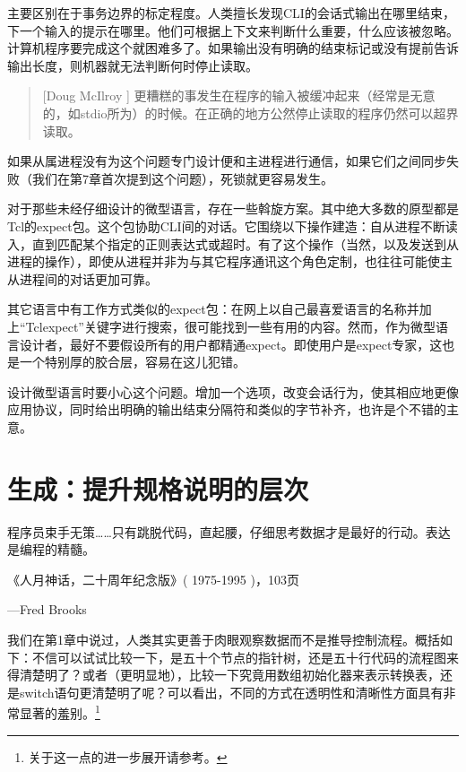 \documentclass[12pt,oneside]{book}
\begin{document}
\begin{common-format}
主要区别在于事务边界的标定程度。人类擅长发现CLI的会话式输出在哪里结束，下一个输入的提示在哪里。他们可根据上下文来判断什么重要，什么应该被忽略。计算机程序要完成这个就困难多了。如果输出没有明确的结束标记或没有提前告诉输出长度，则机器就无法判断何时停止读取。

\begin{quote}[Doug McIlroy 	]
更糟糕的事发生在程序的输入被缓冲起来（经常是无意的，如stdio所为）的时候。在正确的地方公然停止读取的程序仍然可以超界读取。
\end{quote}

如果从属进程没有为这个问题专门设计便和主进程进行通信，如果它们之间同步失败（我们在第7章首次提到这个问题），死锁就更容易发生。

对于那些未经仔细设计的微型语言，存在一些斡旋方案。其中绝大多数的原型都是Tcl的expect包。这个包协助CLI间的对话。它围绕以下操作建造：自从进程不断读入，直到匹配某个指定的正则表达式或超时。有了这个操作（当然，以及发送到从进程的操作），即使从进程并非为与其它程序通讯这个角色定制，也往往可能使主从进程间的对话更加可靠。

其它语言中有工作方式类似的expect包：在网上以自己最喜爱语言的名称并加上“Tclexpect”关键字进行搜索，很可能找到一些有用的内容。然而，作为微型语言设计者，最好不要假设所有的用户都精通expect。即使用户是expect专家，这也是一个特别厚的胶合层，容易在这儿犯错。

设计微型语言时要小心这个问题。增加一个选项，改变会话行为，使其相应地更像应用协议，同时给出明确的输出结束分隔符和类似的字节补齐，也许是个不错的主意。



\chapter{生成：提升规格说明的层次}
\begin{flushright}
\begin{notecard}{30em}
程序员束手无策……只有跳脱代码，直起腰，仔细思考数据才是最好的行动。表达是编程的精髓。

《人月神话，二十周年纪念版》( 1975-1995 )，103页

{\hfill —Fred Brooks}
\end{notecard}
\end{flushright}

我们在第1章中说过，人类其实更善于肉眼观察数据而不是推导控制流程。概括如下：不信可以试试比较一下，是五十个节点的指针树，还是五十行代码的流程图来得清楚明了？或者（更明显地），比较一下究竟用数组初始化器来表示转换表，还是switch语句更清楚明了呢？可以看出，不同的方式在透明性和清晰性方面具有非常显著的羞别。\footnote{关于这一点的进一步展开请参考\cite{Bentley}。}


\end{common-format}
\end{document}
